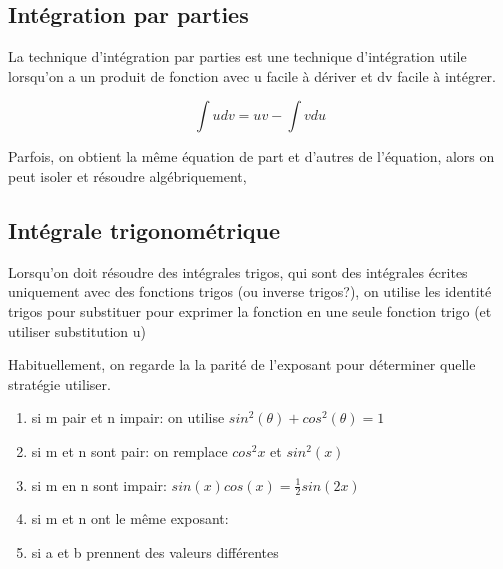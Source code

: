 \documentclass{article}
\begin{document}
\subsection{Intégration par parties}

La technique d'intégration par parties est une technique d'intégration utile
lorsqu'on a un produit de fonction avec u facile à dériver et dv facile à
intégrer.

\begin{theorem}
    $$ \int u dv = uv - \int v du $$
\end{theorem}

\begin{remark}
    Parfois, on obtient la même équation de part et d'autres de l'équation,
    alors on peut isoler et résoudre algébriquement,
\end{remark}

\subsection{Intégrale trigonométrique}

Lorsqu'on doit résoudre des intégrales trigos, qui sont des intégrales
écrites uniquement avec des fonctions trigos (ou inverse trigos?), on
utilise les identité trigos pour substituer pour exprimer la fonction en
une seule fonction trigo (et utiliser substitution u)

Habituellement, on regarde la la parité de l'exposant pour déterminer quelle
stratégie utiliser.

\begin{enumerate}
    \item si m pair et n impair: on utilise
	$ sin^2(\theta) + cos^2(\theta) = 1$
    \item si m et n sont pair: on remplace $cos^2x$ et $sin^2(x)$
    \item si m en n sont impair: $ sin(x) cos(x) = \frac{1}{2} sin(2x)$
    \item si m et n ont le même exposant:
    \item si a et b prennent des valeurs différentes
\end{enumerate}
\end{document}
